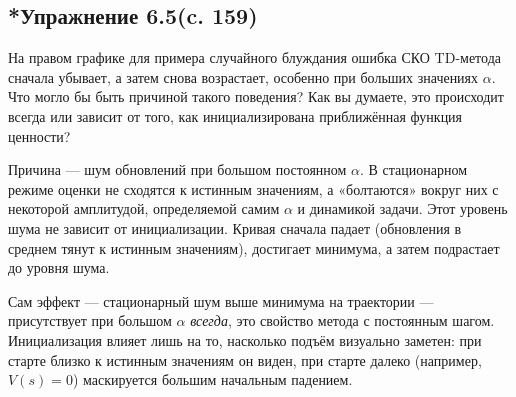 \subsection{*Упражнение 6.5(c. 159)}
На правом графике для примера случайного блуждания ошибка СКО TD-метода сначала убывает, а затем снова возрастает, особенно при больших значениях $\alpha$. Что могло бы быть причиной такого поведения? Как вы думаете, это происходит всегда или зависит от того, как инициализирована приближённая функция ценности?
\begin{solution}
    Причина — шум обновлений при большом постоянном $\alpha$. В стационарном режиме оценки не сходятся к истинным значениям, а «болтаются» вокруг них с некоторой амплитудой, определяемой самим $\alpha$ и динамикой задачи. Этот уровень шума не зависит от инициализации. Кривая сначала падает (обновления в среднем тянут к истинным значениям), достигает минимума, а затем подрастает до уровня шума.

    Сам эффект — стационарный шум выше минимума на траектории — присутствует при большом $\alpha$ \emph{всегда}, это свойство метода с постоянным шагом. Инициализация влияет лишь на то, насколько подъём визуально заметен: при старте близко к истинным значениям он виден, при старте далеко (например, $V(s) = 0$) маскируется большим начальным падением.
\end{solution}

